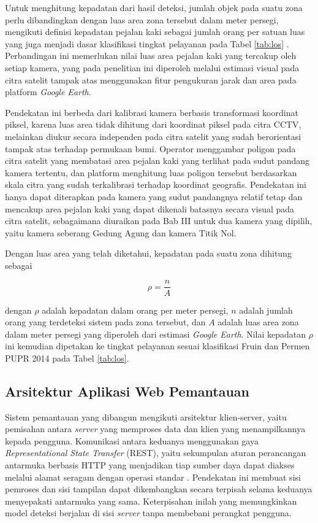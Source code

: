 Untuk menghitung kepadatan dari hasil deteksi, jumlah objek pada suatu zona perlu 
dibandingkan dengan luas area zona tersebut dalam meter persegi, mengikuti definisi 
kepadatan pejalan kaki sebagai jumlah orang per satuan luas yang juga menjadi dasar 
klasifikasi tingkat pelayanan pada Tabel \ref{tab:los} \cite{fruin1971designing}. 
Perbandingan ini memerlukan nilai luas area pejalan kaki yang tercakup oleh setiap kamera, 
yang pada penelitian ini diperoleh melalui estimasi visual pada citra satelit tampak atas 
menggunakan fitur pengukuran jarak dan area pada platform \textit{Google Earth}.

Pendekatan ini berbeda dari kalibrasi kamera berbasis transformasi koordinat piksel, karena 
luas area tidak dihitung dari koordinat piksel pada citra CCTV, melainkan diukur secara 
independen pada citra satelit yang sudah berorientasi tampak atas terhadap permukaan bumi. 
Operator menggambar poligon pada citra satelit yang membatasi area pejalan kaki yang 
terlihat pada sudut pandang kamera tertentu, dan platform menghitung luas poligon tersebut 
berdasarkan skala citra yang sudah terkalibrasi terhadap koordinat geografis. Pendekatan ini 
hanya dapat diterapkan pada kamera yang sudut pandangnya relatif tetap dan mencakup area 
pejalan kaki yang dapat dikenali batasnya secara visual pada citra satelit, sebagaimana 
diuraikan pada Bab III untuk dua kamera yang dipilih, yaitu kamera seberang Gedung Agung dan 
kamera Titik Nol.

Dengan luas area yang telah diketahui, kepadatan pada suatu zona dihitung sebagai

\begin{equation}
    \rho = \frac{n}{A}
    \label{eq:kepadatan}
\end{equation}

dengan $\rho$ adalah kepadatan dalam orang per meter persegi, $n$ adalah jumlah orang yang 
terdeteksi sistem pada zona tersebut, dan $A$ adalah luas area zona dalam meter persegi yang 
diperoleh dari estimasi \textit{Google Earth}. Nilai kepadatan $\rho$ ini kemudian dipetakan 
ke tingkat pelayanan sesuai klasifikasi Fruin dan Permen PUPR 2014 pada Tabel 
\ref{tab:los}.

\subsection{Arsitektur Aplikasi Web Pemantauan}

Sistem pemantauan yang dibangun mengikuti arsitektur klien-server, yaitu pemisahan antara 
\textit{server} yang memproses data dan klien yang menampilkannya kepada pengguna. 
Komunikasi antara keduanya menggunakan gaya \textit{Representational State Transfer} (REST), 
yaitu sekumpulan aturan perancangan antarmuka berbasis HTTP yang menjadikan tiap sumber daya 
dapat diakses melalui alamat seragam dengan operasi standar \cite{fielding2000rest}. 
Pendekatan ini membuat sisi pemroses dan sisi tampilan dapat dikembangkan secara terpisah 
selama keduanya menyepakati antarmuka yang sama. Keterpisahan inilah yang memungkinkan model 
deteksi berjalan di sisi \textit{server} tanpa membebani perangkat pengguna.

